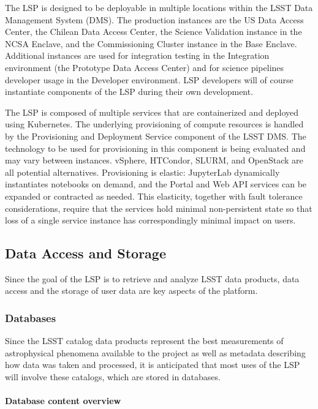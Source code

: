 The LSP is designed to be deployable in multiple locations within the LSST
Data Management System (DMS).
The production instances are the US Data Access Center, the Chilean Data Access
Center, the Science Validation instance in the NCSA Enclave, and the
Commissioning Cluster instance in the Base Enclave.
Additional instances are used for integration testing in the Integration
environment (the Prototype Data Access Center) and for science
pipelines developer usage in the Developer environment.
LSP developers will
of course instantiate components of the LSP during their own development.

The LSP is composed of multiple services that are containerized and deployed
using Kubernetes.  The underlying provisioning of compute resources is handled
by the Provisioning and Deployment Service component of the LSST DMS.  The
technology to be used for provisioning in this component is being evaluated and
may vary between instances.  vSphere, HTCondor, SLURM, and OpenStack are all
potential alternatives.  Provisioning is elastic: JupyterLab dynamically
instantiates notebooks on demand, and the Portal and Web API services can be
expanded or contracted as needed.
This elasticity, together with fault tolerance considerations, require that
the services hold minimal non-persistent state so
that loss of a single service instance has correspondingly minimal impact on
users.

\subsection{Data Access and Storage}\label{data-access-and-storage}

Since the goal of the LSP is to retrieve and analyze LSST data products,
data access and the storage of user data are key aspects of the platform.

\subsubsection{Databases}\label{databases}

Since the LSST catalog data products represent the best measurements of
astrophysical phenomena available to the project as well as metadata
describing how data was taken and processed, it is anticipated that
most uses of the LSP will involve these catalogs, which are stored in
databases.

\paragraph{Database content overview}\label{database-content-overview}

